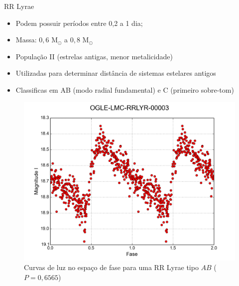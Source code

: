 \documentclass{beamer}
\begin{document}
\begin{frame}[allowframebreaks]{RR Lyrae}

\begin{itemize}
  \item Podem possuir períodos entre 0,2 a 1 dia;
  \item Massa: $0,6$ M$_\odot$ a $0,8$ M$_\odot$
  \item População II (estrelas antigas, menor metalicidade)
  \item Utilizadas para determinar distância de sistemas estelares antigos
  \item Classificas em AB (modo radial fundamental) e C (primeiro sobre-tom)
\end{itemize}

\framebreak


\begin{figure}
\centering
\includegraphics[width=0.68\linewidth]{rrlyrAB.png}
\caption{Curvas de luz no espaço de fase para uma  RR Lyrae tipo $AB$ ($P=0,6565$)}
\label{fig:right}
\end{figure}
\end{frame}
\end{document}
